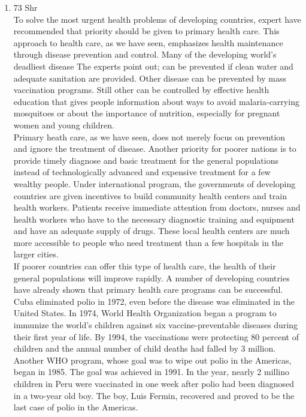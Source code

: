 \documentclass[12pt]{article}
\begin{document}
\begin{enumerate}
      Over the past twenty years ,the hands-woven carpet industry has grown and flourished in Nepal. The art of carpet weaving was brought from Tibet.\\

      The mighty peaks of Himalayan ranges are what call many visitors to Nepal in the first place but nevertheless the beauty of the kingdom's art and architecture will linger in the minds of many for long after a visit to the valley of Kathmandu.

    \item 73 Shr\\
      To solve the most urgent health problems of developing countries, expert have recommended that priority should be given to primary health care. This approach to health care, as we have seen, emphasizes health maintenance through disease prevention and control. Many of the developing world’s deadliest disease The experts point out; can be prevented if clean water and adequate sanitation are provided. Other disease can be prevented by mass vaccination programs. Still other can be controlled by effective health education that gives people information about ways to avoid malaria-carrying mosquitoes or about the importance of nutrition, especially for pregnant women and young children.\\

      Primary heath care, as we have seen, does not merely focus on prevention and ignore the treatment of disease. Another priority for poorer nations is to provide timely diagnose and basic treatment for the general populations instead of technologically advanced and expensive treatment for a few wealthy people. Under international program, the governments of developing countries are given incentives to build community health centers and train health workers. Patients receive immediate attention from doctors, nurses and health workers who have to the necessary diagnostic training and equipment and have an adequate supply of drugs. These local health centers are much more accessible to people who need treatment than a few hospitals in the larger cities.\\

      If poorer countries can offer this type of health care, the health of their general populations will improve rapidly. A number of developing countries have already shown that primary health care programs can be successful. Cuba eliminated polio in 1972, even before the disease was eliminated in the United States. In 1974, World Health Organization began a program to immunize the world's children against six vaccine-preventable diseases during their first year of life. By 1994, the vaccinations were protecting 80 percent of children and the annual number of child deaths had falled by 3 million. Another WHO program, whose goal was to wipe out polio in the Americas, began in 1985. The goal was achieved in 1991. In the year, nearly 2 millino children in Peru were vaccinated in one week after polio had been diagnosed in a two-year old boy. The boy, Luis Fermin, recovered and proved to be the last case of polio in the Americas.


\end{enumerate}
\end{document}
